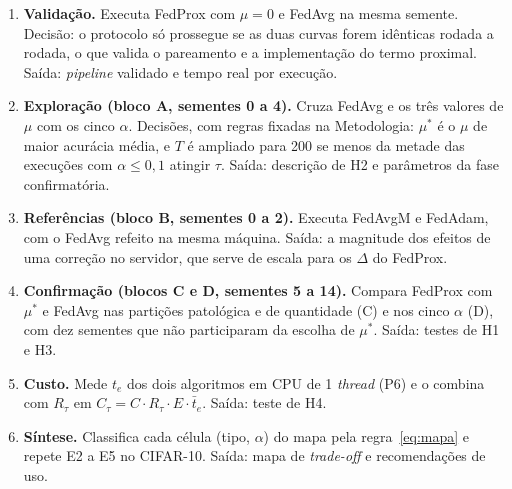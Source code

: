 \begin{enumerate}[label=\textbf{E\arabic*.}, leftmargin=*, itemsep=1pt]
    \item \textbf{Validação.} Executa FedProx com $\mu = 0$ e FedAvg na mesma semente. Decisão: o protocolo só prossegue se as duas curvas forem idênticas rodada a rodada, o que valida o pareamento e a implementação do termo proximal. Saída: \textit{pipeline} validado e tempo real por execução.
    \item \textbf{Exploração (bloco A, sementes 0 a 4).} Cruza FedAvg e os três valores de $\mu$ com os cinco $\alpha$. Decisões, com regras fixadas na Metodologia: $\mu^*$ é o $\mu$ de maior acurácia média, e $T$ é ampliado para 200 se menos da metade das execuções com $\alpha \leq 0{,}1$ atingir $\tau$. Saída: descrição de H2 e parâmetros da fase confirmatória.
    \item \textbf{Referências (bloco B, sementes 0 a 2).} Executa FedAvgM e FedAdam, com o FedAvg refeito na mesma máquina. Saída: a magnitude dos efeitos de uma correção no servidor, que serve de escala para os $\Delta$ do FedProx.
    \item \textbf{Confirmação (blocos C e D, sementes 5 a 14).} Compara FedProx com $\mu^*$ e FedAvg nas partições patológica e de quantidade (C) e nos cinco $\alpha$ (D), com dez sementes que não participaram da escolha de $\mu^*$. Saída: testes de H1 e H3.
    \item \textbf{Custo.} Mede $t_e$ dos dois algoritmos em CPU de 1 \textit{thread} (P6) e o combina com $R_\tau$ em $C_\tau = C \cdot R_\tau \cdot E \cdot \bar{t}_e$. Saída: teste de H4.
    \item \textbf{Síntese.} Classifica cada célula (tipo, $\alpha$) do mapa pela regra~\eqref{eq:mapa} e repete E2 a E5 no CIFAR-10. Saída: mapa de \textit{trade-off} e recomendações de uso.
\end{enumerate}

